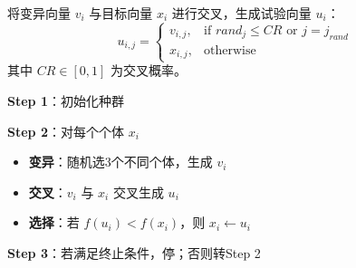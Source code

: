 \begin{definition}[DE的交叉操作]
将变异向量 $v_i$ 与目标向量 $x_i$ 进行交叉，生成试验向量 $u_i$：
\[
u_{i,j} = \begin{cases} v_{i,j}, & \text{if } rand_j \leq CR \text{ or } j = j_{rand} \\ x_{i,j}, & \text{otherwise} \end{cases}
\]
其中 $CR \in [0, 1]$ 为交叉概率。
\end{definition}

\begin{algobox}[DE算法]
\textbf{Step 1}：初始化种群

\textbf{Step 2}：对每个个体 $x_i$
\begin{itemize}
    \item \textbf{变异}：随机选3个不同个体，生成 $v_i$
    \item \textbf{交叉}：$v_i$ 与 $x_i$ 交叉生成 $u_i$
    \item \textbf{选择}：若 $f(u_i) < f(x_i)$，则 $x_i \leftarrow u_i$
\end{itemize}

\textbf{Step 3}：若满足终止条件，停；否则转Step 2
\end{algobox}

